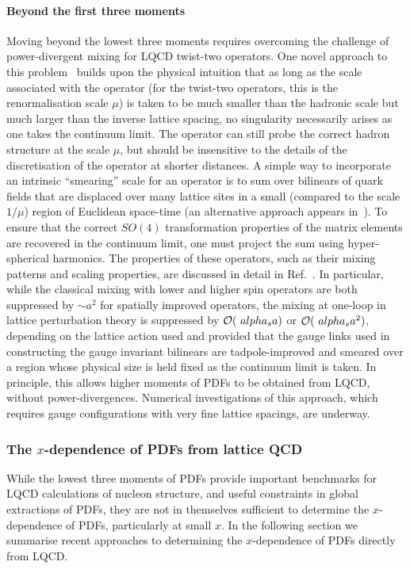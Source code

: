 \paragraph*{Beyond the first three moments} Moving beyond the lowest three moments requires overcoming the challenge of power-divergent mixing for LQCD twist-two operators. One novel approach to this problem~\cite{Davoudi:2012ya} builds upon the physical intuition that as long as the scale associated with the operator (for the twist-two operators, this is the renormalisation scale $\mu$) is taken to be much smaller than the hadronic scale but much larger than the inverse lattice spacing, no singularity necessarily arises as one takes the continuum limit. The operator can still probe the correct hadron structure at the scale $\mu$, but should be insensitive to the details of the discretisation of the operator at shorter distances. A simple way to incorporate an intrinsic ``smearing” scale for an operator is to sum over bilinears of quark fields that are displaced over many lattice sites in a small (compared to the scale $1/\mu$) region of Euclidean space-time (an alternative approach appears in~\cite{Monahan:2015lha}). To ensure that the correct $SO(4)$ transformation properties of the matrix elements are recovered in the continuum limit, one must project the sum using hyper-spherical harmonics. The properties of these operators, such as their mixing patterns and scaling properties, are discussed in detail in
Ref.~\cite{Davoudi:2012ya}. In particular, while the classical mixing with lower and higher spin operators are both suppressed by $\sim a^2$ for spatially improved operators, the mixing at one-loop in lattice perturbation theory is suppressed by ${\cal O}(\ alpha_s a)$ or ${\cal O}(\ alpha_s a^2)$, depending on the lattice action used and provided that the gauge links used in constructing the gauge invariant bilinears are tadpole-improved and smeared over a region whose physical size is held fixed as the continuum limit is taken. In principle, this allows higher moments of PDFs to be obtained from LQCD, without power-divergences. Numerical investigations of this approach,
which requires gauge configurations with very fine lattice spacings, are underway.

\subsubsection{The $x$-dependence of PDFs from lattice QCD}

While the lowest three moments of PDFs provide important benchmarks for LQCD calculations of nucleon structure, and useful constraints in global extractions of PDFs, they are not in themselves sufficient to determine the $x$-dependence of PDFs, particularly at small $x$. In the following section we summarise recent approaches to determining the $x$-dependence of PDFs directly from LQCD.

